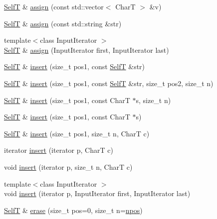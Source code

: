 \begin{CompactItemize}
\hyperlink{classvector__string}{SelfT} \& \hyperlink{classvector__string_afc4812e811663b17b6239b7ae2343e3}{assign} (const std::vector$<$ CharT $>$ \&v)
\item 
\hyperlink{classvector__string}{SelfT} \& \hyperlink{classvector__string_945a71bc52a850219f28f7c19afd2a13}{assign} (const std::string \&str)
\item 
{\footnotesize template$<$class InputIterator $>$ }\\\hyperlink{classvector__string}{SelfT} \& \hyperlink{classvector__string_763bc15c22982c7fa76f1419e67d53b5}{assign} (InputIterator first, InputIterator last)
\item 
\hyperlink{classvector__string}{SelfT} \& \hyperlink{classvector__string_601a84cd50754d049e8bdb9d54242913}{insert} (size\_\-t pos1, const \hyperlink{classvector__string}{SelfT} \&str)
\item 
\hyperlink{classvector__string}{SelfT} \& \hyperlink{classvector__string_9cf16247816c7d93ecffc2b41f8cba4a}{insert} (size\_\-t pos1, const \hyperlink{classvector__string}{SelfT} \&str, size\_\-t pos2, size\_\-t n)
\item 
\hyperlink{classvector__string}{SelfT} \& \hyperlink{classvector__string_74c7a4822a48e44db82676e5601d3afe}{insert} (size\_\-t pos1, const CharT $\ast$s, size\_\-t n)
\item 
\hyperlink{classvector__string}{SelfT} \& \hyperlink{classvector__string_04f6c42efcbfd652e14268771f67df94}{insert} (size\_\-t pos1, const CharT $\ast$s)
\item 
\hyperlink{classvector__string}{SelfT} \& \hyperlink{classvector__string_c1a1bf0ea437e457a0b8a6ea543e5a7a}{insert} (size\_\-t pos1, size\_\-t n, CharT c)
\item 
iterator \hyperlink{classvector__string_6251982b3c851185d13665546d77f7ac}{insert} (iterator p, CharT c)
\item 
void \hyperlink{classvector__string_0f84ccc1d6e7829d6514c9afeb6ec454}{insert} (iterator p, size\_\-t n, CharT c)
\item 
{\footnotesize template$<$class InputIterator $>$ }\\void \hyperlink{classvector__string_6eb256890eb9c74e68961a837d228011}{insert} (iterator p, InputIterator first, InputIterator last)
\item 
\hyperlink{classvector__string}{SelfT} \& \hyperlink{classvector__string_11798027c9245194f48e666c45e0d6d9}{erase} (size\_\-t pos=0, size\_\-t n=\hyperlink{classvector__string_073b48043937e79ead0703a49426be1a}{npos})
\item 

\end{CompactItemize}
